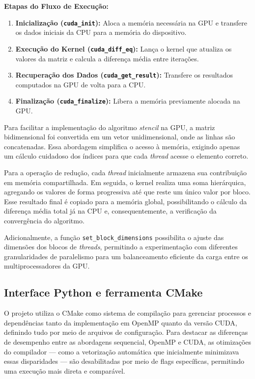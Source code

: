 \documentclass[12pt]{article}
\begin{document}
\textbf{Etapas do Fluxo de Execução:}
\begin{enumerate}
  \item \textbf{Inicialização (\texttt{cuda\_init}):}
        Aloca a memória necessária na GPU e transfere os dados iniciais da CPU para a memória do dispositivo.
  \item \textbf{Execução do Kernel (\texttt{cuda\_diff\_eq}):}
        Lança o kernel que atualiza os valores da matriz e calcula a diferença média entre iterações.
  \item \textbf{Recuperação dos Dados (\texttt{cuda\_get\_result}):}
        Transfere os resultados computados na GPU de volta para a CPU.
  \item \textbf{Finalização (\texttt{cuda\_finalize}):}
        Libera a memória previamente alocada na GPU.
\end{enumerate}

Para facilitar a implementação do algoritmo \textit{stencil} na GPU, a matriz
bidimensional foi convertida em um vetor unidimensional, onde as linhas são
concatenadas. Essa abordagem simplifica o acesso à memória, exigindo apenas um
cálculo cuidadoso dos índices para que cada \textit{thread} acesse o elemento
correto.

Para a operação de redução, cada \textit{thread} inicialmente armazena sua
contribuição em memória compartilhada. Em seguida, o kernel realiza uma soma
hierárquica, agregando os valores de forma progressiva até que reste um único
valor por bloco. Esse resultado final é copiado para a memória global,
possibilitando o cálculo da diferença média total já na CPU e,
consequentemente, a verificação da convergência do algoritmo.

Adicionalmente, a função \texttt{set\_block\_dimensions} possibilita o ajuste
das dimensões dos blocos de \textit{threads}, permitindo a experimentação com
diferentes granularidades de paralelismo para um balanceamento eficiente da
carga entre os multiprocessadores da GPU.

\subsection{Interface Python e ferramenta CMake}

O projeto utiliza o CMake como sistema de compilação para gerenciar processos e
dependências tanto da implementação em OpenMP quanto da versão CUDA, definindo
tudo por meio de arquivos de configuração. Para destacar as diferenças de
desempenho entre as abordagens sequencial, OpenMP e CUDA, as otimizações do
compilador — como a vetorização automática que inicialmente minimizava essas
disparidades — são desabilitadas por meio de flags específicas, permitindo uma
execução mais direta e comparável.
\end{document}
